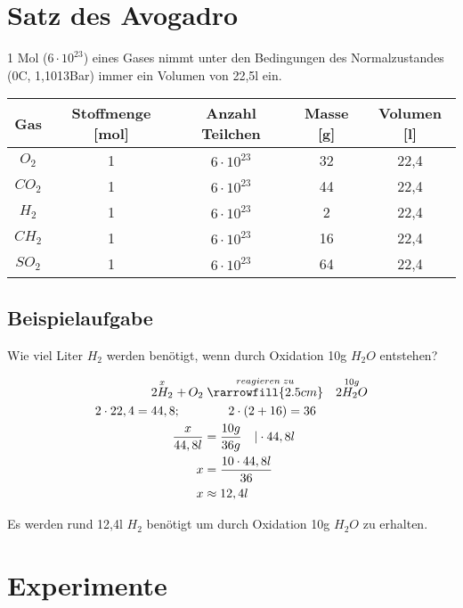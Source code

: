 \section{Satz des Avogadro}
1 Mol ($6\cdot 10^{23}$) eines Gases nimmt unter den Bedingungen des Normalzustandes (0\:\textdegree C, 1,1013Bar) immer ein
Volumen von 22,5l ein.

\begin{longtable}{|c|c|c|c|c|}
\hline Gas & Stoffmenge [mol] & Anzahl Teilchen & Masse [g] & Volumen [l] \\
\hline $O_2$ & 1 & $6 \cdot 10^{23}$ & 32 & 22,4 \\
\hline $CO_2$ & 1 & $6 \cdot 10^{23}$ & 44 & 22,4 \\
\hline $H_2$ & 1 & $6 \cdot 10^{23}$ & 2 & 22,4 \\
\hline $CH_2$ & 1 & $6 \cdot 10^{23}$ & 16 & 22,4 \\
\hline $SO_2$ & 1 & $6 \cdot 10^{23}$ & 64 & 22,4 \\
\hline
\end{longtable}

\newpage
\subsection{Beispielaufgabe}%
Wie viel Liter $H_2$ werden benötigt, wenn durch Oxidation 10g $H_2O$ entstehen?

\begin{align}
\stackrel{x}{2H_2} +\, {O_2}	&\stackrel{reagieren\;zu}{\rarrowfill{2.5cm}}\quad \stackrel{10g}{2H_2O} \\
2\cdot 22,4=44,8;		\qquad	&\qquad 2\cdot (2+16)=36 \\
\frac{x}{44,8l}					&= \frac{10g}{36g}\quad\vert \cdot 44,8l \\
x								&= \frac{10\cdot 44,8l}{36} \\
x								&\approx 12,4l
\end{align}

Es werden rund 12,4l $H_2$ benötigt um durch Oxidation 10g $H_2O$ zu erhalten.


\section{Experimente}
